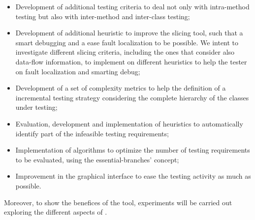 \begin{itemize}
    \item Development of additional testing criteria to deal not
    only with intra-method testing but also with inter-method and
    inter-class testing;

    \item Development of additional heuristic to improve the slicing
    tool, such that a smart debugging and a ease fault localization to
    be possible. We intent to investigate different slicing criteria,
    including the ones that consider also data-flow information, to implement
    on \toolname different heuristics to help the tester on fault localization
    and smarting debug;

    \item Development of a set of complexity metrics to help the definition
    of a incremental testing strategy considering the complete hierarchy of
    the classes under testing;

    \item Evaluation, development and implementation of heuristics
    to automatically identify part of the infeasible testing
    requirements;

    \item Implementation of algorithms to optimize the number of
    testing requirements to be evaluated, using the
    essential-branches' concept;

    \item Improvement in the graphical interface to ease the
    testing activity as much as possible.
\end{itemize}

Moreover, to show the benefices of the tool, experiments will be
carried out exploring the different aspects of \toolname.

